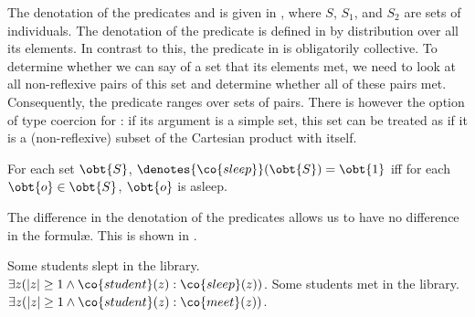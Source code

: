 \documentclass[output=paper]{langsci/langscibook}
\begin{document}
The denotation of the predicates  and  is given
in , where $S$, $S_1$, and $S_2$ are sets of individuals.
The denotation of the predicate  is defined in  by distribution over all its elements.
In contrast to this, the predicate  in  is obligatorily collective.
To determine whether we can say of a set that its elements met, we need to look at all non-reflexive pairs of this set and determine whether all of these pairs met.
Consequently, the predicate  ranges over sets of pairs. There is however the option of type coercion for : if its argument is a simple set, this set can be treated as if it is a (non-reflexive) subset of the Cartesian product with itself.
%


\ea \label{def-sleep-gather}
\begin{xlist}
\ex \label{def-sleep}
For each set $\obt{S}$, $\denotes{\co{sleep}}(\obt{S}) = \obt{1}$ iff
for each $\obt{o} \in \obt{S}$, $\obt{o}$ is asleep.
\end{xlist}
\z 


The difference in the denotation of the predicates allows us to have no difference in the formul\ae. This is shown in .

\ea \label{ex-sleep-gather}
\begin{xlist}
\ex \label{dog-sleep}
Some students slept in the library.\\
$\exists z (|z| \geq 1 \land \co{student}(z) : \co{sleep}(z))$.  
\ex \label{dog-gather}
Some students met in the library.\\
$\exists z (|z| \geq 1 \land \co{student}(z) : \co{meet}(z))$.
\end{xlist}
\z
\end{document}
